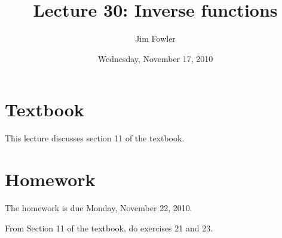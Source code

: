 \documentclass[12pt]{handout}
\title{Lecture 30: Inverse functions}
\author{Jim Fowler}
\date{Wednesday, November 17, 2010}
\begin{document}
\maketitle

\section*{Textbook}

This lecture discusses section 11 of the textbook.

\section*{Homework} 

The homework is due Monday, November 22, 2010.

From Section 11 of the textbook, do exercises 21 and 23.
\end{document}
